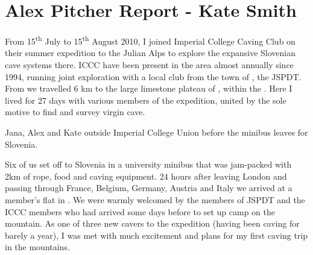\section{Alex Pitcher Report - Kate Smith}



From 15\textsuperscript{th} July to 15\textsuperscript{th} August 2010, I joined Imperial College Caving Club on their summer expedition
to the Julian Alps to explore the expansive Slovenian cave systems there. ICCC have been present
in the area almost annually since 1994, running joint exploration with a local club from the town
of , the JSPDT. From  we travelled 6 km to the large limestone plateau of , within the . Here I lived for 27 days with various members of the
expedition, united by the sole motive to find and survey virgin cave.



    \begin{marginfigure}
\checkoddpage \ifoddpage \forcerectofloat \else \forceversofloat \fi
\centering
 \caption{Jana, Alex and Kate outside Imperial College Union before the minibus leaves for Slovenia. }
 \label{bus union 2010}
\end{marginfigure}


Six of us set off to Slovenia in a university minibus that was jam-packed with 2km of rope, food
and caving equipment. 24 hours after leaving London and passing through France, Belgium, Germany,
Austria and Italy we arrived at a member's flat in . We were warmly welcomed by the members
of JSPDT and the ICCC members who had arrived some days before to set up camp on the mountain.
As one of three new cavers to the expedition (having been caving for barely a year), I was met with
much excitement and plans for my first caving trip in the mountains.

